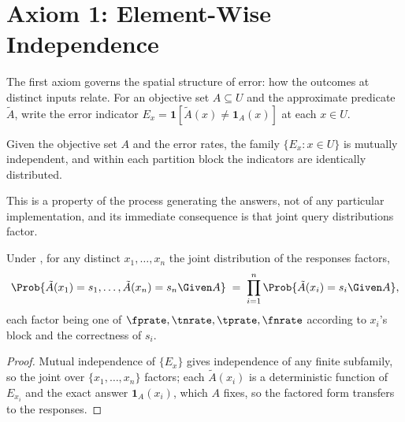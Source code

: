 %

\section{Axiom 1: Element-Wise Independence}
\label{sec:axiom-1}

The first axiom governs the spatial structure of error: how the outcomes at
distinct inputs relate. For an objective set $A \subseteq U$ and the
approximate predicate $\tilde{A}$, write the error indicator $E_x = \mathbf{1}[
\tilde{A}(x) \neq \mathbf{1}_A(x)]$ at each $x \in U$.

\begin{axiom}
\label{ax:element-indep}
Given the objective set $A$ and the error rates, the family $\{E_x : x \in U\}$
is mutually independent, and within each partition block the indicators are
identically distributed.
\end{axiom}

This is a property of the process generating the answers, not of any particular
implementation, and its immediate consequence is that joint query distributions
factor.

\begin{proposition}
\label{prop:factored-joint}
Under , for any distinct $x_1, \ldots, x_n$ the joint
distribution of the responses factors,
\[
  \Prob{\tilde{A}(x_1) = s_1, \ldots, \tilde{A}(x_n) = s_n \Given A}
  \;=\; \prod_{i=1}^{n} \Prob{\tilde{A}(x_i) = s_i \Given A},
\]
each factor being one of $\fprate, \tnrate, \tprate, \fnrate$ according to
$x_i$'s block and the correctness of $s_i$.
\end{proposition}

\begin{proof}
Mutual independence of $\{E_x\}$ gives independence of any finite subfamily, so
the joint over $\{x_1, \ldots, x_n\}$ factors; each $\tilde{A}(x_i)$ is a
deterministic function of $E_{x_i}$ and the exact answer $\mathbf{1}_A(x_i)$,
which $A$ fixes, so the factored form transfers to the responses.
\end{proof}

